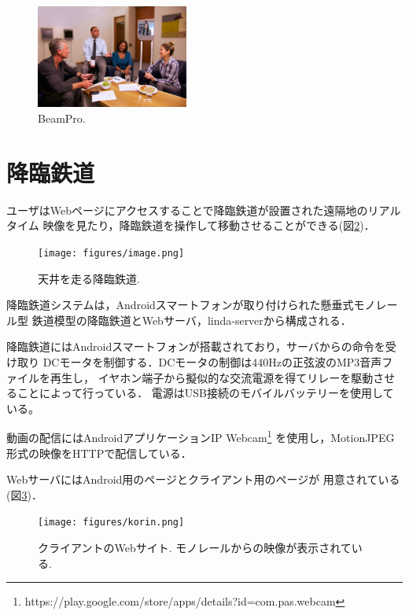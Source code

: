 \documentclass[submit,techreq]{ipsj}
\begin{document}
\begin{figure}[H]
\centerline{\includegraphics[width=50mm]{figures/2c092d5d4467d5b2572acef0c95b22ff.png}}
\caption{BeamPro.}
\label{beampro}
\end{figure}


\section{降臨鉄道}

ユーザはWebページにアクセスすることで降臨鉄道が設置された遠隔地のリアルタイム
映像を見たり，降臨鉄道を操作して移動させることができる(図\ref{monorail})．

\begin{figure}[H]
\begin{center}
\texttt{[image: figures/image.png]}
\end{center}
\caption{天井を走る降臨鉄道.}
\label{monorail}
\end{figure}


降臨鉄道システムは，Androidスマートフォンが取り付けられた懸垂式モノレール型
鉄道模型の降臨鉄道とWebサーバ，linda-serverから構成される．

降臨鉄道にはAndroidスマートフォンが搭載されており，サーバからの命令を受け取り
DCモータを制御する．DCモータの制御は440Hzの正弦波のMP3音声ファイルを再生し，
イヤホン端子から擬似的な交流電源を得てリレーを駆動させることによって行っている．
電源はUSB接続のモバイルバッテリーを使用している。

動画の配信にはAndroidアプリケーションIP Webcam\footnote{
  \textsf{https://play.google.com/store/apps/details?id=com.pas.webcam}
}
を使用し，MotionJPEG形式の映像をHTTPで配信している．

WebサーバにはAndroid用のページとクライアント用のページが
用意されている(図\ref{browser})．

\begin{figure}[H]
\begin{center}
\texttt{[image: figures/korin.png]}
\end{center}
\caption{クライアントのWebサイト. モノレールからの映像が表示されている.}
\label{browser}
\end{figure}
\end{document}
